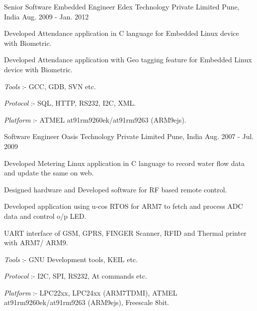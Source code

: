 \begin{cventries}
  \cventry
    {Senior Software Embedded Engineer} %
    {Edex Technology Private Limited} %
    {Pune, India} %
    {Aug. 2009 - Jan. 2012} %
    {
      \begin{cvitems} %
        \item {Developed Attendance application in C language for Embedded Linux device with Biometric.}
        \item {Developed Attendance application with Geo tagging feature for Embedded Linux device with Biometric.}
        \item {\textit{Tools} :- GCC, GDB, SVN etc.}
        \item {\textit{Protocol} :- SQL, HTTP, RS232, I2C, XML.}
        \item {\textit{Platform} :- ATMEL at91rm9260ek/at91rm9263 (ARM9ejs).}
      \end{cvitems}
    }

  \cventry
    {Software Engineer} %
    {Oasis Technology Private Limited} %
    {Pune, India} %
    {Aug. 2007 - Jul. 2009} %
    {
      \begin{cvitems} %
        \item {Developed Metering Linux application in C language to record water flow data and update the same on web.}
        \item {Designed hardware and Developed software for RF based remote control.}
        \item {Developed application using u-cos RTOS for ARM7 to fetch and process ADC data and control o/p LED.}
        \item {UART interface of GSM, GPRS, FINGER Scanner, RFID and Thermal printer with ARM7/ ARM9.}
        \item {\textit{Tools} :- GNU Development tools, KEIL etc.}
        \item {\textit{Protocol} :- I2C, SPI, RS232, At commands etc.}
        \item {\textit{Platform} :- LPC22xx, LPC24xx (ARM7TDMI), ATMEL at91rm9260ek/at91rm9263 (ARM9ejs), Freescale 8bit.}
      \end{cvitems}
    }


\end{cventries}
